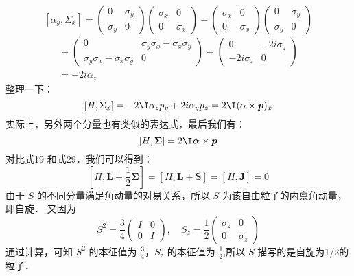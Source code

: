 \begin{equation}
\left[\alpha_{y}, \Sigma_{x}\right] = \left(\begin{array}{cc}
0 & \sigma_{y} \\
\sigma_{y} & 0
\end{array}\right)\left(\begin{array}{cc}
\sigma_{x} & 0 \\
0 & \sigma_{x}
\end{array}\right)-\left(\begin{array}{cc}
\sigma_{x} & 0 \\
0 & \sigma_{x}
\end{array}\right)\left(\begin{array}{cc}
0 & \sigma_{y} \\
\sigma_{y} & 0
\end{array}\right)
\end{equation}
\begin{equation}
\begin{array}{l}
=\left(\begin{array}{cc}
0 & \sigma_{y} \sigma_{x}-\sigma_{x} \sigma_{y} \\
\sigma_{y} \sigma_{x}-\sigma_{x} \sigma_{y} & 0
\end{array}\right)=\left(\begin{array}{cc}
0 & -2 i \sigma_{z} \\
-2 i \sigma_{z} & 0
\end{array}\right) \\
=-2 i \alpha_{z}
\end{array}
\end{equation}
整理一下：
\begin{equation}
\left[H, \Sigma_{x}\right]=-2  \I \alpha_{z} p_{y}+2 i \alpha_{y} p_{z}=2  \I(\alpha \times \boldsymbol{p})_{x}
\end{equation}
实际上，另外两个分量也有类似的表达式，最后我们有：
\begin{equation}\label{qed4_eq19}
[H, \mathbf{\Sigma}]=2  \I \boldsymbol{\alpha} \times \boldsymbol{p}
\end{equation}
对比式19 和式29，我们可以得到：
\begin{equation}
\left[H, \boldsymbol{L}+\frac{1}{2} \boldsymbol{\Sigma}\right]=[H, \boldsymbol{L}+\boldsymbol{S}]=[H, \boldsymbol{J}]=0
\end{equation}
由于 $S$ 的不同分量满足角动量的对易关系，所以 $S$ 为该自由粒子的内禀角动量，即自旋．
又因为
\begin{equation}
S^{2}=\frac{3}{4}\left(\begin{array}{ll}
I & 0 \\
0 & I
\end{array}\right), \quad S_{z}=\frac{1}{2}\left(\begin{array}{cc}
\sigma_{z} & 0 \\
0 & \sigma_{z}
\end{array}\right)
\end{equation}
通过计算，可知 $S^2$ 的本征值为 $\frac{3}{4}$，$S_{z}$ 的本征值为 $\frac{1}{2}$,所以 $S$ 描写的是自旋为1/2的粒子．

